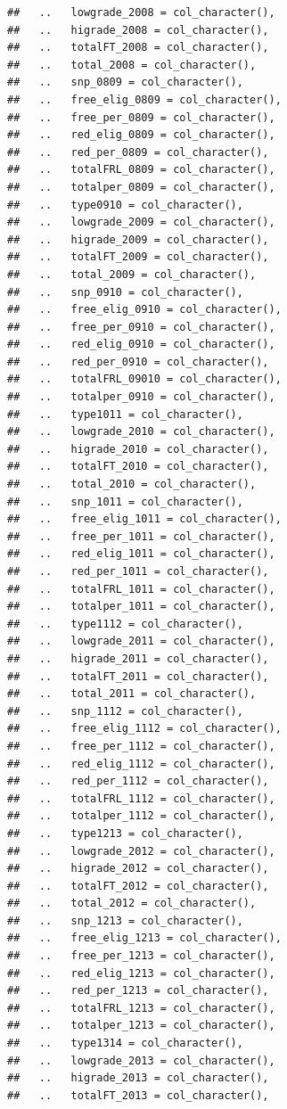 \documentclass[
]{book}
\begin{document}
\begin{verbatim}
##   ..   lowgrade_2008 = col_character(),
##   ..   higrade_2008 = col_character(),
##   ..   totalFT_2008 = col_character(),
##   ..   total_2008 = col_character(),
##   ..   snp_0809 = col_character(),
##   ..   free_elig_0809 = col_character(),
##   ..   free_per_0809 = col_character(),
##   ..   red_elig_0809 = col_character(),
##   ..   red_per_0809 = col_character(),
##   ..   totalFRL_0809 = col_character(),
##   ..   totalper_0809 = col_character(),
##   ..   type0910 = col_character(),
##   ..   lowgrade_2009 = col_character(),
##   ..   higrade_2009 = col_character(),
##   ..   totalFT_2009 = col_character(),
##   ..   total_2009 = col_character(),
##   ..   snp_0910 = col_character(),
##   ..   free_elig_0910 = col_character(),
##   ..   free_per_0910 = col_character(),
##   ..   red_elig_0910 = col_character(),
##   ..   red_per_0910 = col_character(),
##   ..   totalFRL_09010 = col_character(),
##   ..   totalper_0910 = col_character(),
##   ..   type1011 = col_character(),
##   ..   lowgrade_2010 = col_character(),
##   ..   higrade_2010 = col_character(),
##   ..   totalFT_2010 = col_character(),
##   ..   total_2010 = col_character(),
##   ..   snp_1011 = col_character(),
##   ..   free_elig_1011 = col_character(),
##   ..   free_per_1011 = col_character(),
##   ..   red_elig_1011 = col_character(),
##   ..   red_per_1011 = col_character(),
##   ..   totalFRL_1011 = col_character(),
##   ..   totalper_1011 = col_character(),
##   ..   type1112 = col_character(),
##   ..   lowgrade_2011 = col_character(),
##   ..   higrade_2011 = col_character(),
##   ..   totalFT_2011 = col_character(),
##   ..   total_2011 = col_character(),
##   ..   snp_1112 = col_character(),
##   ..   free_elig_1112 = col_character(),
##   ..   free_per_1112 = col_character(),
##   ..   red_elig_1112 = col_character(),
##   ..   red_per_1112 = col_character(),
##   ..   totalFRL_1112 = col_character(),
##   ..   totalper_1112 = col_character(),
##   ..   type1213 = col_character(),
##   ..   lowgrade_2012 = col_character(),
##   ..   higrade_2012 = col_character(),
##   ..   totalFT_2012 = col_character(),
##   ..   total_2012 = col_character(),
##   ..   snp_1213 = col_character(),
##   ..   free_elig_1213 = col_character(),
##   ..   free_per_1213 = col_character(),
##   ..   red_elig_1213 = col_character(),
##   ..   red_per_1213 = col_character(),
##   ..   totalFRL_1213 = col_character(),
##   ..   totalper_1213 = col_character(),
##   ..   type1314 = col_character(),
##   ..   lowgrade_2013 = col_character(),
##   ..   higrade_2013 = col_character(),
##   ..   totalFT_2013 = col_character(),

\end{verbatim}
\end{document}
